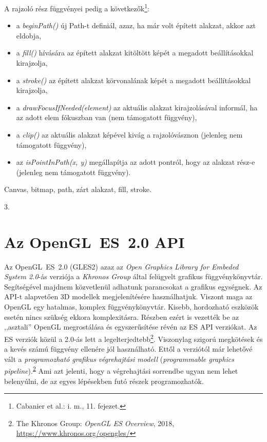 \documentclass[12pt]{report}
\theoremstyle{definition}
\newcommand{\inenglish}[1]{\textsl{#1}}
\newcommand{\func}[1]{{\textsl{#1}}}
\begin{document}
A rajzoló rész függvényei pedig a következők\footnote{Cabanier et al.: i.
m., 11. fejezet.}:
\begin{itemize}
  \item a \func{beginPath()} új Path-t definiál, azaz, ha már volt épített
  alakzat, akkor azt eldobja,
  \item a \func{fill()} hívására az épített alakzat kitöltött képét a
  megadott beállításokkal kirajzolja,
  \item a \func{stroke()} az épített alakzat körvonalának képét a
  megadott beállításokkal kirajzolja,
  \item a \func{drawFocusIfNeeded(element)} az aktuális alakzat kirajzolásával
   informál, ha az adott elem fókuszban van (nem támogatott függvény),
  \item a \func{clip()} az aktuális alakzat képével kivág a
  rajzolóvásznon (jelenleg nem támogatott függvény),
  \item az \func{isPointInPath(x, y)} megállapítja az adott pontról, hogy az
  alakzat rész-e (jelenleg nem támogatott függvény).
\end{itemize}

  \begin{description}[noitemsep]
    \item[Kulcsszavak] Canvas, bitmap, path, zárt alakzat, fill, stroke.
    \item[Becsült oldalszám] 3.
  \end{description}

    \section{Az OpenGL~ES~2.0 API}
    \label{GLES2:API}

Az OpenGL~ES~2.0 (GLES2) azaz az \emph{Open Graphics Library for Embeded System
2.0}-ás verziója a \emph{Khronos Group} által felügyelt grafikus
függvénykönyvtár.  Segítségével majdnem közvetlenül adhatunk parancsokat a
grafikus egységnek. Az API-t alapvetően 3D modellek megjelenítésére
használhatjuk. Viszont maga az OpenGL egy hatalmas, komplex függvénykönyvtár.
Kisebb, hordozható eszközök esetén nincs szükség ekkora komplexitásra. Részben
ezért is vezették be az ,,asztali'' OpenGL megrostálása és egyszerűsítése révén
az ES API verziókat. Az ES verziók közül a 2.0-ás lett a
legelterjedtebb\footnote{The Khronos Group: \emph{OpenGL ES Overview}, 2018,
\footnotesize{\url{https://www.khronos.org/opengles/}}\label{fn:GLES2}}.
Viszonylag szigorú megkötések és a kevés számú függvény ellenére jól
használható. Ettől a verziótól már lehetővé vált a \emph{programozható grafikus
végrehajtási modell} (\inenglish{programmable graphics
pipeline}).\textsuperscript{\ref{fn:GLES2}} Ami azt jelenti, hogy a
végrehajtási sorrendbe ugyan nem lehet belenyúlni, de az egyes lépésekben futó
részek programozhatók.
\end{document}
